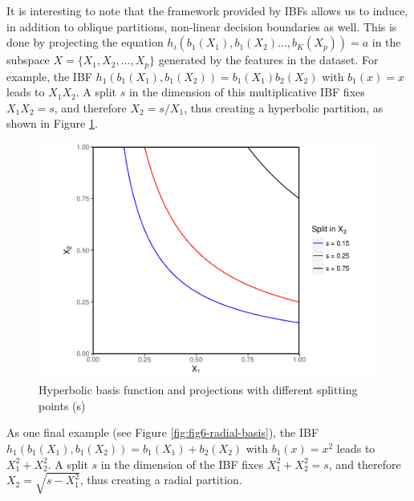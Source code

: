 \documentclass[]{elsarticle} %
\makeatletter
\def\maxwidth{\ifdim\Gin@nat@width>\linewidth\linewidth
\else\Gin@nat@width\fi}
\let\Oldincludegraphics\includegraphics
\renewcommand{\includegraphics}[1]{\Oldincludegraphics[width=\maxwidth]{#1}}
\makeatother
\begin{document}
It is interesting to note that the framework provided by IBFs allows us
to induce, in addition to oblique partitions, non-linear decision
boundaries as well. This is done by projecting the equation
\(h_i(b_1(X_1),b_1(X_2)\dots, b_K(X_p))=a\) in the subspace
\(X=\{X_1, X_2,\dots, X_p\}\) generated by the features in the dataset.
For example, the IBF \(h_1(b_1(X_1),b_1(X_2))=b_1(X_1)b_2(X_2)\) with
\(b_1(x)=x\) leads to \(X_1X_2\). A split \(s\) in the dimension of this
multiplicative IBF fixes \(X_1X_2=s\), and therefore \(X_2=s/X_1\), thus
creating a hyperbolic partition, as shown in Figure
\ref{fig:fig5-hyperbolic-basis}.

\begin{figure}[htbp]
\centering
\includegraphics{Trees_with_Base_Functions_files/figure-latex/fig5-hyperbolic-basis-1.pdf}
\caption{\label{fig:fig5-hyperbolic-basis}Hyperbolic basis function and
projections with different splitting points (s)}
\end{figure}

As one final example (see Figure \ref{fig:fig6-radial-basis}), the IBF
\(h_1(b_1(X_1),b_1(X_2))=b_1(X_1)+b_2(X_2)\) with \(b_1(x)=x^2\) leads
to \(X_1^2 + X_2^2\). A split \(s\) in the dimension of the IBF fixes
\(X_1^2 + X_2^2=s\), and therefore \(X_2=\sqrt{s-X_1^2}\), thus creating
a radial partition.
\end{document}
